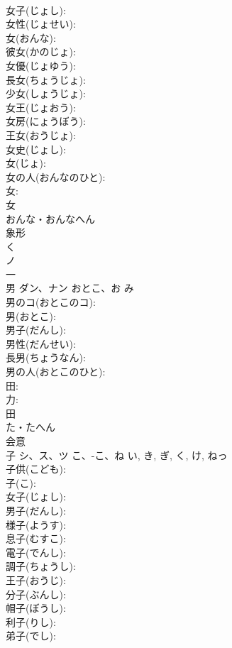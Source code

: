 \documentclass[8pt]{extreport}
\begin{document}
\begin{CJK}{UTF8}{min}
\\	女子(じょし): 
\\	女性(じょせい): 
\\	女(おんな): 
\\	彼女(かのじょ): 
\\	女優(じょゆう): 
\\	長女(ちょうじょ): 
\\	少女(しょうじょ): 
\\	女王(じょおう): 
\\	女房(にょうぼう): 
\\	王女(おうじょ): 
\\	女史(じょし): 
\\	女(じょ): 
\\	女の人(おんなのひと): 
\\	女: 
\\	女	
\\	おんな・おんなへん	
\\	象形 
\\	く
\\	ノ
\\	一
\\	男	ダン、ナン	おとこ、お	み	
\\	男のコ(おとこのコ): 
\\	男(おとこ): 
\\	男子(だんし): 
\\	男性(だんせい): 
\\	長男(ちょうなん): 
\\	男の人(おとこのひと): 
\\	田: 
\\	力: 
\\	田	
\\	た・たへん	
\\	会意 
\\	子	シ、ス、ツ	こ、-こ、ね	い, き, ぎ, く, け, ねっ	
\\	子供(こども): 
\\	子(こ): 
\\	女子(じょし): 
\\	男子(だんし): 
\\	様子(ようす): 
\\	息子(むすこ): 
\\	電子(でんし): 
\\	調子(ちょうし): 
\\	王子(おうじ): 
\\	分子(ぶんし): 
\\	帽子(ぼうし): 
\\	利子(りし): 
\\	弟子(でし): 

\end{CJK}
\end{document}
